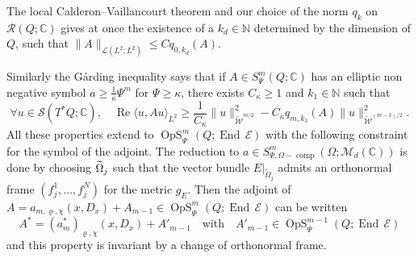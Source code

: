 \documentclass[AHL,Unicode,longabstracts]{cedram}
\newcommand{\C}{\mathbb{C}}
\newcommand{\N}{\mathbb{N}}
\newcommand{\clW}{\mathcal{W}}
\newcommand{\clE}{\mathcal{E}}
\newcommand{\clS}{\mathcal{S}}
\newcommand{\clL}{\mathcal{L}}
\newcommand{\clR}{\mathcal{R}}
\newcommand{\clM}{\mathcal{M}}
\DeclareMathOperator{\Ree}{Re}
\DeclareMathOperator{\End}{End}
\DeclareMathOperator{\OpS}{OpS}
\DeclareMathOperator{\ccomp}{comp}
\let\oldtilde\tilde
\renewcommand*{\tilde}[1]{\mathchoice{\widetilde{#1}}{\widetilde{#1}}{\oldtilde{#1}}{\oldtilde{#1}}}
\let\oldforall\forall
\renewcommand*{\forall}{\mathrel{\oldforall}}
\begin{document}
The local Calderon--Vaillancourt theorem and our choice of the norm $q_{k}$ on $\clR(Q;\C)$ gives at once the existence of a $k_{d}\in \N$ determined by the dimension of $Q$, such that $\|A\|_{\clL(L^{2};L^{2})}\leq C q_{0,k_{d}}(A)$.

Similarly the G\aa rding inequality says that if $A\in S^{m}_{\Psi}(Q;\C)$ has an elliptic non negative symbol $a\geq \frac{1}{\kappa}\Psi^{m}$ for $\Psi\geq \kappa$, there exists $C_{\kappa}\geq 1$ and $k_{1}\in \N$ such that
\[
\forall u\in \clS(T^{*}Q;\C),\quad \Ree\langle u, A u\rangle_{L^{2}}\geq \frac{1}{C_{\kappa}}\|u\|^{2}_{\widetilde{\clW}^{m/2}}-C_{\kappa}q_{m,k_{1}}(A)\|u\|_{\widetilde{\clW}^{(m-1)/2}}^{2}.
\]
All these properties extend to $\OpS^{m}_{\Psi}(Q;\End\,\clE)$ with the following constraint for the symbol of the adjoint. The reduction to $a\in S^{m}_{\Psi, \Omega-\ccomp}(\Omega;\clM_{d}(\C))$ is done by choosing $\tilde{\Omega}_{j}$ such that the vector bundle $E|_{\widetilde{\Omega}_{j}}$ admits an orthonormal frame $(f_{j}^{1},\dots,f_{j}^{N})$ for the metric $g_{E}$. Then the adjoint of $A=a_{m,\varrho,\chi}(x,D_{x})+A_{m-1}\in \OpS^{m}_{\Psi}(Q;\End\,\clE)$ can be written
\[
A^{*}=(a_{m}^{*})_{\varrho,\chi}(x,D_{x})+A'_{m-1}\quad\text{with}\quad A'_{m-1}\in \OpS^{m-1}_{\Psi}(Q;\End\,\clE)
\]
and this property is invariant by a change of orthonormal frame.
\end{document}
